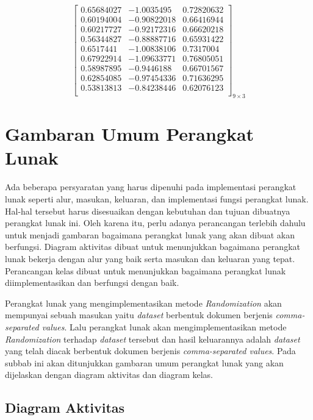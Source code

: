 \begin{enumerate}
\begin{equation}
\begin{bmatrix}
        0.65684027 &  -1.0035495   &  0.72820632 \\
        0.60194004 &  -0.90822018  &  0.66416944 \\
        0.60217727  & -0.92172316  &  0.66620218 \\
        0.56344827 &  -0.88887716  &  0.65931422 \\
        0.6517441   & -1.00838106  &  0.7317004  \\
        0.67922914  & -1.09633771  &  0.76805051 \\
        0.58987895  & -0.9446188   &  0.66701567 \\
        0.62854085  & -0.97454336  &  0.71636295 \\
        0.53813813  & -0.84238446  &  0.62076123 \\
        \end{bmatrix}_{9\times 3}
    \end{equation}
\end{enumerate}

\section{Gambaran Umum Perangkat Lunak}
\label{sec:gambaran-pl}

Ada beberapa persyaratan yang harus dipenuhi pada implementasi perangkat lunak seperti alur, masukan, keluaran, dan implementasi fungsi perangkat lunak. Hal-hal tersebut harus disesuaikan dengan kebutuhan dan tujuan dibuatnya perangkat lunak ini. Oleh karena itu, perlu adanya perancangan terlebih dahulu untuk menjadi gambaran bagaimana perangkat lunak yang akan dibuat akan berfungsi. Diagram aktivitas dibuat untuk menunjukkan bagaimana perangkat lunak bekerja dengan alur yang baik serta masukan dan keluaran yang tepat. Perancangan kelas dibuat untuk menunjukkan bagaimana perangkat lunak diimplementasikan dan berfungsi dengan baik.

Perangkat lunak yang mengimplementasikan metode \textit{Randomization} akan mempunyai sebuah masukan yaitu \textit{dataset} berbentuk dokumen berjenis \textit{comma-separated values}. Lalu perangkat lunak akan mengimplementasikan metode \textit{Randomization} terhadap \textit{dataset} tersebut dan hasil keluarannya adalah \textit{dataset} yang telah diacak berbentuk dokumen berjenis \textit{comma-separated values}. Pada subbab ini akan ditunjukkan gambaran umum perangkat lunak yang akan dijelaskan dengan diagram aktivitas dan diagram kelas.

\subsection{Diagram Aktivitas}
\label{subsec:diagram-aktivitas}


